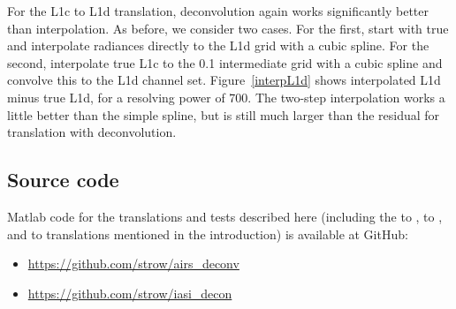 \documentclass[journal]{IEEEtran}
\begin{document}
For the {\airs} L1c to L1d translation, deconvolution again works
significantly better than interpolation.  As before, we consider two
cases.  For the first, start with true {\airs} and interpolate
radiances directly to the L1d grid with a cubic spline.  For the
second, interpolate true L1c to the 0.1 {\wn} intermediate grid with
a cubic spline and convolve this to the L1d channel set.
Figure~\ref{interpL1d} shows interpolated L1d minus true L1d, for a
resolving power of 700.  The two-step interpolation works a little
better than the simple spline, but is still much larger than the
residual for translation with deconvolution.

\subsection{Source code}

Matlab code for the translations and tests described here (including
the {\iasi} to {\cris}, {\iasi} to {\airs}, and {\cris} to {\airs}
translations mentioned in the introduction) is available at GitHub:

\begin{itemize}
   \item \url{https://github.com/strow/airs_deconv}
   \item \url{https://github.com/strow/iasi_decon}
\end{itemize}

% 
% 




\vspace{10cm}\vfill
\end{document}

